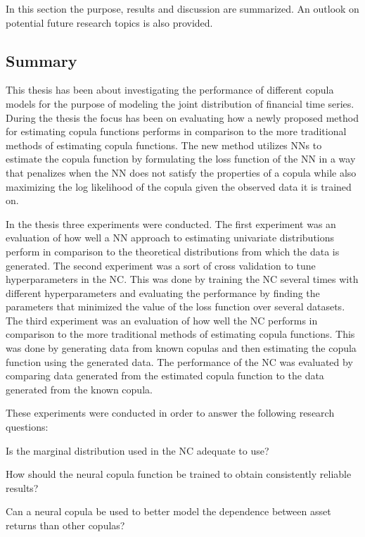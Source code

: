 In this section the purpose, results and discussion are summarized. An outlook on potential future research topics is also provided. 

\subsection{Summary}
This thesis has been about investigating the performance of different copula models for the purpose of modeling the joint distribution of financial time series. During the thesis the focus has been on evaluating how a newly proposed  method for estimating copula functions performs in comparison to the more traditional methods of estimating copula functions. The new method utilizes \gls{NN}s to estimate the copula function by formulating the loss function of the \gls{NN} in a way that penalizes when the \gls{NN} does not satisfy the properties of a copula while also maximizing the log likelihood of the copula given the observed data it is trained on. 

In the thesis three experiments were conducted. The first experiment was an evaluation of how well a \gls{NN} approach to estimating univariate distributions perform in comparison to the theoretical distributions from which the data is generated. The second experiment was a sort of cross validation to tune hyperparameters in the \gls{NC}. This was done by training the \gls{NC} several times with different hyperparameters and evaluating the performance by finding the parameters that minimized the value of the loss function over several datasets. The third experiment was an evaluation of how well the \gls{NC} performs in comparison to the more traditional methods of estimating copula functions. This was done by generating data from known copulas and then estimating the copula function using the generated data. The performance of the \gls{NC} was evaluated by comparing data generated from the estimated copula function to the data generated from the known copula.  

These experiments were conducted in order to answer the following research questions:
\begin{compactenum}[{\bfseries RQ}1]
    \item \label{item:RQ1} Is the marginal distribution used in the \gls{NC} adequate to use?
    \item \label{item:RQ2} How should the neural copula function be trained to obtain consistently reliable results?
    \item \label{item:RQ3} Can a neural copula be used to better model the dependence between asset returns than other copulas?
\end{compactenum}

